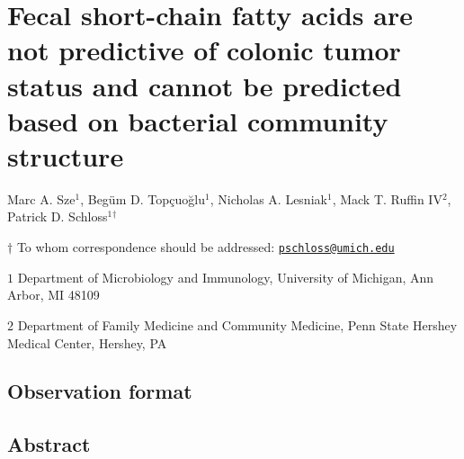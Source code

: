 \documentclass[11pt,]{article}
\title{}
\author{}
\date{}
\begin{document}
\vspace{35mm}

\hypertarget{fecal-short-chain-fatty-acids-are-not-predictive-of-colonic-tumor-status-and-cannot-be-predicted-based-on-bacterial-community-structure}{%
\section{Fecal short-chain fatty acids are not predictive of colonic
tumor status and cannot be predicted based on bacterial community
structure}\label{fecal-short-chain-fatty-acids-are-not-predictive-of-colonic-tumor-status-and-cannot-be-predicted-based-on-bacterial-community-structure}}

\vspace{35mm}

Marc A. Sze\({^1}\), Begüm D. Topçuoğlu\({^1}\), Nicholas A.
Lesniak\({^1}\), Mack T. Ruffin IV\({^2}\), Patrick D.
Schloss\({^1}\)\({^\dagger}\)

\vspace{40mm}

\(\dagger\) To whom correspondence should be addressed:
\href{mailto:pschloss@umich.edu}{\nolinkurl{pschloss@umich.edu}}

\(1\) Department of Microbiology and Immunology, University of Michigan,
Ann Arbor, MI 48109

\(2\) Department of Family Medicine and Community Medicine, Penn State
Hershey Medical Center, Hershey, PA

\vspace{10mm}

\hypertarget{observation-format}{%
\subsection{Observation format}\label{observation-format}}

\newpage
\linenumbers

\hypertarget{abstract}{%
\subsection{Abstract}\label{abstract}}
\end{document}
